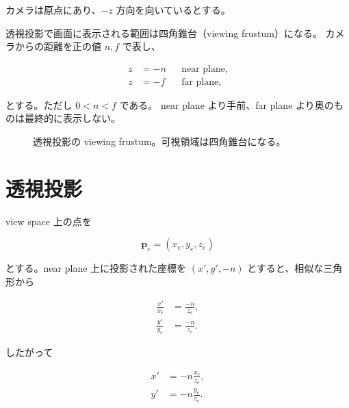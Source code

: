 \documentclass[a4paper,11pt]{ltjsarticle}
\begin{document}
カメラは原点にあり、$-z$ 方向を向いているとする。

透視投影で画面に表示される範囲は四角錐台（viewing frustum）になる。
カメラからの距離を正の値 $n,f$ で表し、

\begin{align*}
  z &= -n && \text{near plane},\\
  z &= -f && \text{far plane},
\end{align*}

とする。ただし $0<n<f$ である。
near plane より手前、far plane より奥のものは最終的に表示しない。

\begin{figure}[htbp]
  \centering
  \caption{透視投影の viewing frustum。可視領域は四角錐台になる。}
\end{figure}

\section{透視投影}

view space 上の点を

\[
  \bm{p}_e = (x_e,y_e,z_e)
\]

とする。near plane 上に投影された座標を $(x',y',-n)$ とすると、相似な三角形から

\begin{align*}
  \frac{x'}{x_e} &= \frac{-n}{z_e},\\
  \frac{y'}{y_e} &= \frac{-n}{z_e}.
\end{align*}

したがって

\begin{align}
  x' &= -n\frac{x_e}{z_e},\\
  y' &= -n\frac{y_e}{z_e}.
\end{align}
\end{document}
